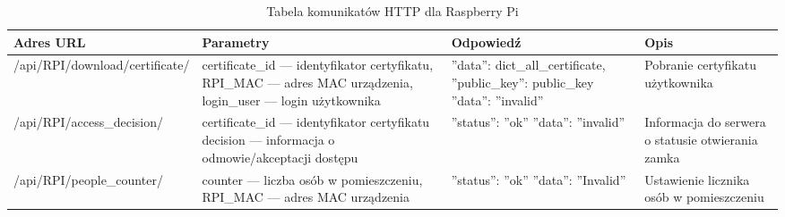 		\begin{longtable}[!ht]{|m{4cm}|m{4.5cm}|m{3.9cm}|m{2.8cm}|} 
			\caption{Tabela komunikatów HTTP dla Raspberry Pi}
			\label{tab:http_raspberry}\\
			\hline	
			Adres URL & Parametry & Odpowiedź & Opis \\	\hline
			/api/RPI/download/\-certificate/ & certificate\_id --- identyfikator certyfikatu, \newline RPI\_MAC --- adres MAC urządzenia, \newline login\_user --- login użytkownika & ''data'': dict\_all\_certificate, \newline ''public\_key'': public\_key \tablinia ''data'': ''invalid'' & Pobranie certyfikatu użytkownika \\ \hline
			/api/RPI/access\_decision/ & certificate\_id --- identyfikator certyfikatu \newline decision --- informacja o odmowie/akceptacji dostępu & ''status'': ''ok'' \tablinia ''data'': ''invalid'' & Informacja do serwera o statusie otwierania zamka \\ \hline
			/api/RPI/people\_counter/ & counter --- liczba osób w pomieszczeniu, \newline RPI\_MAC --- adres MAC urządzenia & ''status'': ''ok'' \tablinia ''data'': ''Invalid'' & Ustawienie licznika osób w pomieszczeniu \\ \hline
		\end{longtable}

